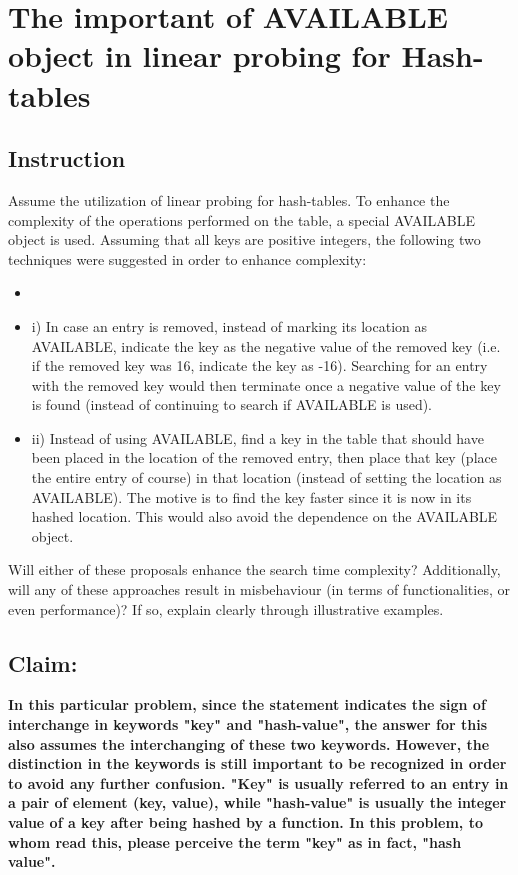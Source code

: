 \section{The important of AVAILABLE object in linear probing for Hash-tables}

\subsection{Instruction}
Assume the utilization of linear probing for hash-tables. To enhance the complexity of the
operations performed on the table, a special AVAILABLE object is used. Assuming that all keys
are positive integers, the following two techniques were suggested in order to enhance complexity:
\begin{itemize}
    \item 
\item[] i) In case an entry is removed, instead of marking its location as AVAILABLE, indicate
the key as the negative value of the removed key (i.e. if the removed key was 16,
indicate the key as -16). Searching for an entry with the removed key would then
terminate once a negative value of the key is found (instead of continuing to search if
AVAILABLE is used).

\item[] ii) Instead of using AVAILABLE, find a key in the table that should have been placed in
the location of the removed entry, then place that key (place the entire entry of course)
in that location (instead of setting the location as AVAILABLE). The motive is to find
the key faster since it is now in its hashed location. This would also avoid the
dependence on the AVAILABLE object.
\end{itemize}
Will either of these proposals enhance the search time complexity? Additionally, will any of these
approaches result in misbehaviour (in terms of functionalities, or even performance)? If so, explain
clearly through illustrative examples. 

\subsection{Claim:}
\textbf{In this particular problem, since the statement indicates the sign of interchange in keywords "key" and "hash-value", the answer for this also assumes the interchanging of these two keywords. However, the distinction in the keywords is still important to be recognized in order to avoid any further confusion. "Key" is usually referred to an entry in a pair of element (key, value), while "hash-value" is usually the integer value of a key after being hashed by a function. In this problem, to whom read this, please perceive the term "key" as in fact, "hash value". }

